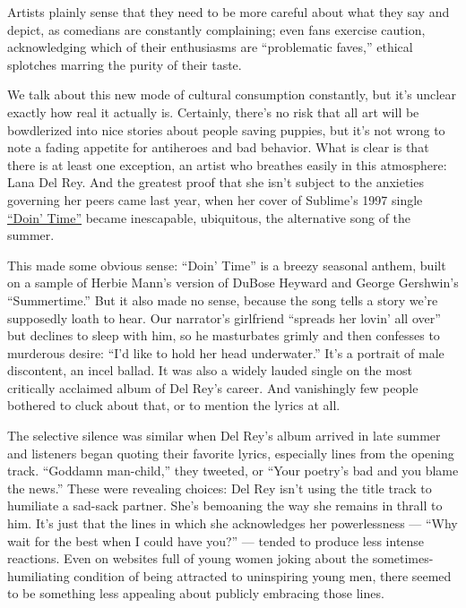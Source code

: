 Artists plainly sense that they need to be more careful about what they
say and depict, as comedians are constantly complaining; even fans
exercise caution, acknowledging which of their enthusiasms are
``problematic faves,'' ethical splotches marring the purity of their
taste.

We talk about this new mode of cultural consumption constantly, but it's
unclear exactly how real it actually is. Certainly, there's no risk that
all art will be bowdlerized into nice stories about people saving
puppies, but it's not wrong to note a fading appetite for antiheroes and
bad behavior. What is clear is that there is at least one exception, an
artist who breathes easily in this atmosphere: Lana Del Rey. And the
greatest proof that she isn't subject to the anxieties governing her
peers came last year, when her cover of Sublime's 1997 single
\href{https://www.youtube.com/watch?v=H3ypeugNzYA}{``Doin' Time''}
became inescapable, ubiquitous, the alternative song of the summer.

This made some obvious sense: ``Doin' Time'' is a breezy seasonal
anthem, built on a sample of Herbie Mann's version of DuBose Heyward and
George Gershwin's ``Summertime.'' But it also made no sense, because the
song tells a story we're supposedly loath to hear. Our narrator's
girlfriend ``spreads her lovin' all over'' but declines to sleep with
him, so he masturbates grimly and then confesses to murderous desire:
``I'd like to hold her head underwater.'' It's a portrait of male
discontent, an incel ballad. It was also a widely lauded single on the
most critically acclaimed album of Del Rey's career. And vanishingly few
people bothered to cluck about that, or to mention the lyrics at all.

The selective silence was similar when Del Rey's album arrived in late
summer and listeners began quoting their favorite lyrics, especially
lines from the opening track. ``Goddamn man-child,'' they tweeted, or
``Your poetry's bad and you blame the news.'' These were revealing
choices: Del Rey isn't using the title track to humiliate a sad-sack
partner. She's bemoaning the way she remains in thrall to him. It's just
that the lines in which she acknowledges her powerlessness --- ``Why
wait for the best when I could have you?'' --- tended to produce less
intense reactions. Even on websites full of young women joking about the
sometimes-humiliating condition of being attracted to uninspiring young
men, there seemed to be something less appealing about publicly
embracing those lines.

